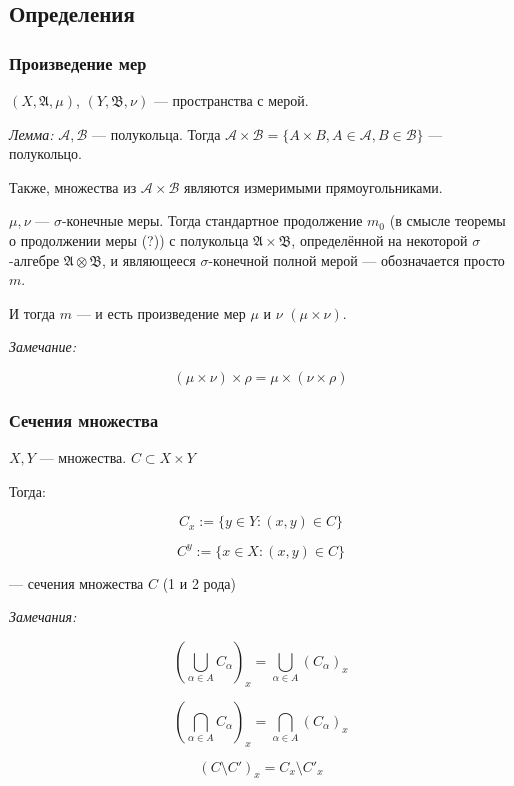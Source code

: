 \documentclass{article}
\begin{document}
\newpage

\subsection{Определения}
\subsubsection{Произведение мер}
$(X, \mathfrak{A}, \mu)$, $(Y, \mathfrak{B}, \nu)$ --- пространства с мерой.

\textit{Лемма: }
$\mathcal{A}, \mathcal{B}$ --- полукольца. Тогда $\mathcal{A} \times \mathcal{B} = \{A \times B, A \in \mathcal{A}, B \in \mathcal{B}\}$ --- полукольцо.

Также, множества из $\mathcal{A} \times \mathcal{B}$ являются измеримыми прямоугольниками.

$\mu, \nu$ --- $\sigma$-конечные меры. Тогда стандартное продолжение $m_{0}$ (в смысле теоремы о продолжении меры (?)) с полукольца $\mathfrak{A} \times \mathfrak{B}$, определённой на некоторой $\sigma$-алгебре $\mathfrak{A} \otimes \mathfrak{B}$, и являющееся $\sigma$-конечной полной мерой --- обозначается просто $m$.

И тогда $m$ --- и есть произведение мер $\mu$ и $\nu$ $(\mu \times \nu)$.

\textit{Замечание: }

\[(\mu \times \nu) \times \rho = \mu \times (\nu \times \rho)\]

\subsubsection{Сечения множества}

$X, Y$ --- множества. $C \subset X \times Y$

Тогда: 

\[C_{x} := \{y \in Y: (x, y) \in C\}\]

\[C^{y} := \{x \in X: (x, y) \in C\}\]

--- сечения множества $C$ (1 и 2 рода)

\textit{Замечания: }

\[\left(\bigcup_{\alpha \in A} C_{\alpha}\right)_{x} = \bigcup_{\alpha \in A} \left(C_{\alpha}\right)_{x}\]

\[\left(\bigcap_{\alpha \in A} C_{\alpha}\right)_{x} = \bigcap_{\alpha \in A} \left(C_{\alpha}\right)_{x}\]

\[\left(C \setminus C'\right)_{x} = C_{x} \setminus C'_{x}\]
\end{document}
